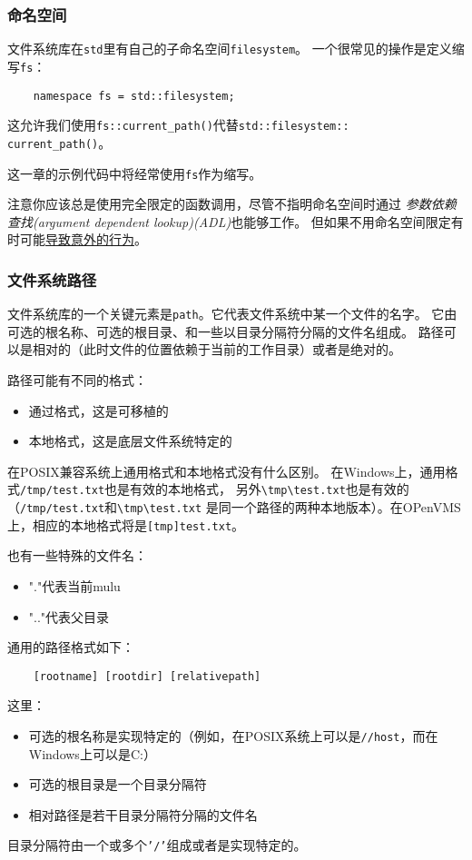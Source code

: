 \subsubsection{命名空间}
文件系统库在\texttt{std}里有自己的子命名空间\texttt{filesystem}。
一个很常见的操作是定义缩写\texttt{fs}：
\begin{lstlisting}
    namespace fs = std::filesystem;
\end{lstlisting}
这允许我们使用\texttt{fs::current\_path()}代替\texttt{std::filesystem::\\
current\_path()}。

这一章的示例代码中将经常使用\texttt{fs}作为缩写。

注意你应该总是使用完全限定的函数调用，尽管不指明命名空间时通过
\emph{参数依赖查找(argument dependent lookup)(ADL)}也能够工作。
但如果不用命名空间限定有时可能\hyperref[ADL导致意外行为]{导致意外的行为}。

\subsubsection{文件系统路径}\label{ch20.2.3}
文件系统库的一个关键元素是\texttt{path}。它代表文件系统中某一个文件的名字。
它由可选的根名称、可选的根目录、和一些以目录分隔符分隔的文件名组成。
路径可以是相对的（此时文件的位置依赖于当前的工作目录）或者是绝对的。

路径可能有不同的格式：
\begin{itemize}[leftmargin=*]
    \item 通过格式，这是可移植的
    \item 本地格式，这是底层文件系统特定的
\end{itemize}
在POSIX兼容系统上通用格式和本地格式没有什么区别。
在Windows上，通用格式\texttt{/tmp/test.txt}也是有效的本地格式，
另外\texttt{\textbackslash tmp\textbackslash test.txt}也是有效的
（\texttt{/tmp/test.txt}和\texttt{\textbackslash tmp\textbackslash test.txt}
是同一个路径的两种本地版本）。在OPenVMS上，相应的本地格式将是\texttt{[tmp]test.txt}。

也有一些特殊的文件名：
\begin{itemize}[leftmargin=*]
    \item "."代表当前mulu
    \item ".."代表父目录
\end{itemize}
通用的路径格式如下：
\begin{lstlisting}
    [rootname] [rootdir] [relativepath]
\end{lstlisting}
这里：
\begin{itemize}[leftmargin=*]
    \item 可选的根名称是实现特定的（例如，在POSIX系统上可以是\texttt{//host}，而在Windows上可以是C:）
    \item 可选的根目录是一个目录分隔符
    \item 相对路径是若干目录分隔符分隔的文件名
\end{itemize}
目录分隔符由一个或多个\texttt{'/'}组成或者是实现特定的。

